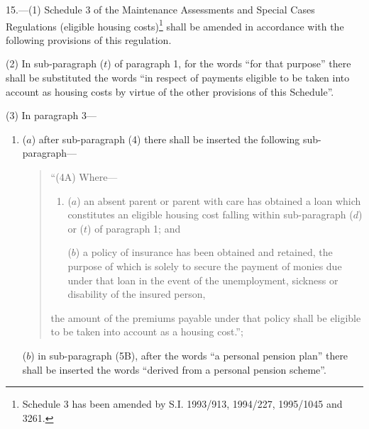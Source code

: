 \documentclass[a4paper]{article}
\begin{document}
15.—(1) Schedule 3 of the Maintenance Assessments and Special Cases Regulations (eligible housing costs)\footnote{\frenchspacing Schedule 3 has been amended by S.I. 1993/913, 1994/227, 1995/1045 and 3261.} shall be amended in accordance with the following provisions of this regulation.

(2) In sub-paragraph ($t$) of paragraph 1, for the words “for that purpose” there shall be substituted the words “in respect of payments eligible to be taken into account as housing costs by virtue of the other provisions of this Schedule”.

(3) In paragraph 3—
\begin{enumerate}\item[]
($a$) after sub-paragraph (4) there shall be inserted the following sub-paragraph—
\begin{quotation}
“(4A) Where—
\begin{enumerate}\item[]
($a$) an absent parent or parent with care has obtained a loan which constitutes an eligible housing cost falling within sub-paragraph ($d$) or ($t$) of paragraph 1; and

($b$) a policy of insurance has been obtained and retained, the purpose of which is solely to secure the payment of monies due under that loan in the event of the unemployment, sickness or disability of the insured person,
\end{enumerate}
the amount of the premiums payable under that policy shall be eligible to be taken into account as a housing cost.”;
\end{quotation}

($b$) in sub-paragraph (5B), after the words “a personal pension plan” there shall be inserted the words “derived from a personal pension scheme”.
\end{enumerate}
\end{document}
